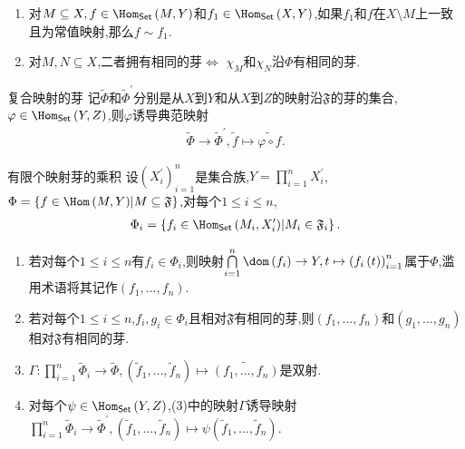 \begin{remark}{}{}
	\begin{enumerate}
		\item 对$M\subseteq X,f\in\Hom_{\mathsf{Set}}\left(M,Y\right)$和$f_{1}\in\Hom_{\mathsf{Set}}\left(X,Y\right)$,如果$f_{1}$和$f$在$X\setminus M$上一致且为常值映射,那么$f\sim f_{1}$.
		\item 对$M,N\subseteq X$,二者拥有相同的芽$\iff$ $\chi_{M}$和$\chi_{N}$沿$\Phi$有相同的芽.
	\end{enumerate}
\end{remark}

\begin{definition}{复合映射的芽}{}
	记$\tilde{\Phi}$和$\tilde{\Phi}^{\prime}$分别是从$X$到$Y$和从$X$到$Z$的映射沿$\mathfrak{F}$的芽的集合,$\varphi\in\Hom_{\mathsf{Set}}\left(Y,Z\right)$,则$\varphi$诱导典范映射
	\begin{align*}
		\tilde{\Phi}\to\tilde{\Phi}^{\prime},\tilde{f}\mapsto\widetilde{\varphi\circ f}.
	\end{align*}
\end{definition}

\begin{proposition}{有限个映射芽的乘积}{}
	设$\left(X_{i}^{\prime}\right)_{i=1}^{n}$是集合族,$Y=\prod\limits_{i=1}^{n}X_{i}^{\prime}$,$\Phi=\left\{f\in\Hom\left(M,Y\right)\middle|M\subseteq\mathfrak{F}\right\}$,对每个$1\leq i\leq n$,
	\begin{align*}
		\Phi_{i}=\left\{f_{i}\in\Hom_{\mathsf{Set}}\left(M_{i},X_{i}^{\prime}\right)\middle|M_{i}\in\mathfrak{F}_{i}\right\}.
	\end{align*}
	\begin{enumerate}
		\item 若对每个$1\leq i\leq n$有$f_{i}\in\Phi_{i}$,则映射$\bigcap\limits_{i=1}^{n}\dom\left(f_{i}\right)\to Y,t\mapsto\left(f_{i}\left(t\right)\right)_{i=1}^{n}$属于$\Phi$,滥用术语将其记作$\left(f_{1},\ldots,f_{n}\right)$.
		\item 若对每个$1\leq i\leq n$,$f_{i},g_{i}\in\Phi_{i}$且相对$\mathfrak{F}$有相同的芽,则$\left(f_{1},\ldots,f_{n}\right)$和$\left(g_{1},\ldots,g_{n}\right)$相对$\mathfrak{F}$有相同的芽.
		\item $\Gamma:\prod\limits_{i=1}^{n}\tilde{\Phi}_{i}\to\tilde{\Phi},\left(\tilde{f}_{1},\ldots,\tilde{f}_{n}\right)\mapsto\widetilde{\left(f_{1},\ldots,f_{n}\right)}$是双射.
		\item 对每个$\psi\in\Hom_{\mathsf{Set}}\left(Y,Z\right)$,(3)中的映射$\Gamma$诱导映射$\prod\limits_{i=1}^{n}\tilde{\Phi}_{i}\to\tilde{\Phi}^{\prime},\left(\tilde{f}_{1},\ldots,\tilde{f}_{n}\right)\mapsto\psi\left(\tilde{f}_{1},\ldots,\tilde{f}_{n}\right)$.
	\end{enumerate}
\end{proposition}

